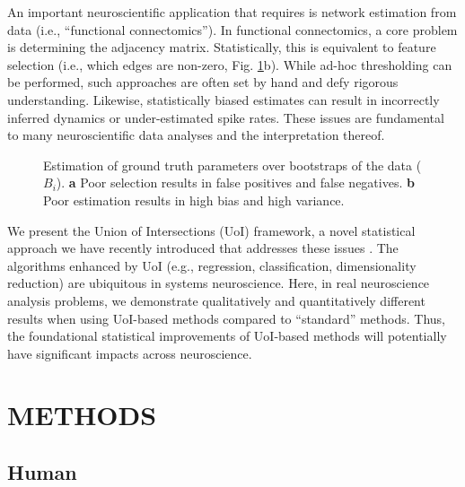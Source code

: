 \documentclass[letterpaper, 10 pt, conference]{ieeeconf}  %
\begin{document}
An important neuroscientific application that requires is network estimation from data (i.e., ``functional connectomics''). In functional connectomics, a core problem is determining the adjacency matrix. Statistically, this is equivalent to feature selection (i.e., which edges are non-zero, Fig.  \ref{fig:intro}b). While ad-hoc thresholding can be performed, such approaches are often set by hand and defy rigorous understanding. Likewise, statistically biased estimates can result in incorrectly inferred dynamics or under-estimated spike rates. These issues are fundamental to many neuroscientific data analyses and the interpretation thereof.

\begin{figure}[b!]
    \vspace{-20pt}
    \centering
    \caption{Estimation of ground truth parameters over bootstraps of the data ($B_i$). \textbf{a} Poor selection results in false positives and false negatives. \textbf{b} Poor estimation results in high bias and high variance.}
    \label{fig:intro}
\end{figure}

We present the Union of Intersections (UoI) framework, a novel statistical approach we have recently introduced that addresses these issues \cite{uoi}. The algorithms enhanced by UoI (e.g., regression, classification, dimensionality reduction) are ubiquitous in systems neuroscience. Here, in real neuroscience analysis problems, we demonstrate qualitatively and quantitatively different results when using UoI-based methods compared to ``standard'' methods.  Thus, the foundational statistical improvements of UoI-based methods will potentially have significant impacts across neuroscience.
\section{METHODS}
\subsection{Human }
\end{document}
